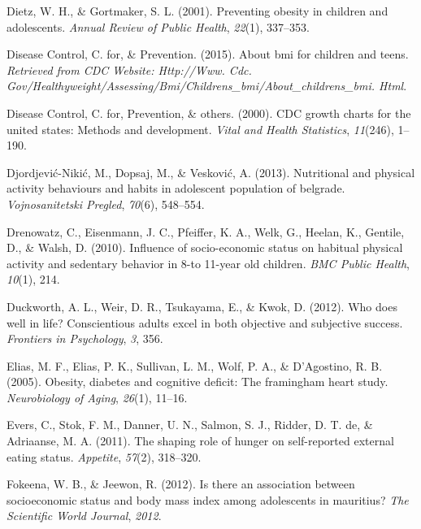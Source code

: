 \documentclass[man]{apa6}
\begin{document}
\leavevmode\hypertarget{ref-dietz2001preventing}{}%
Dietz, W. H., \& Gortmaker, S. L. (2001). Preventing obesity in children and adolescents. \emph{Annual Review of Public Health}, \emph{22}(1), 337--353.

\leavevmode\hypertarget{ref-centers2015bmi}{}%
Disease Control, C. for, \& Prevention. (2015). About bmi for children and teens. \emph{Retrieved from CDC Website: Http://Www. Cdc. Gov/Healthyweight/Assessing/Bmi/Childrens\_bmi/About\_childrens\_bmi. Html}.

\leavevmode\hypertarget{ref-centers2000cdc}{}%
Disease Control, C. for, Prevention, \& others. (2000). CDC growth charts for the united states: Methods and development. \emph{Vital and Health Statistics}, \emph{11}(246), 1--190.

\leavevmode\hypertarget{ref-djordjevic2013nutritional}{}%
Djordjević-Nikić, M., Dopsaj, M., \& Vesković, A. (2013). Nutritional and physical activity behaviours and habits in adolescent population of belgrade. \emph{Vojnosanitetski Pregled}, \emph{70}(6), 548--554.

\leavevmode\hypertarget{ref-drenowatz2010influence}{}%
Drenowatz, C., Eisenmann, J. C., Pfeiffer, K. A., Welk, G., Heelan, K., Gentile, D., \& Walsh, D. (2010). Influence of socio-economic status on habitual physical activity and sedentary behavior in 8-to 11-year old children. \emph{BMC Public Health}, \emph{10}(1), 214.

\leavevmode\hypertarget{ref-duckworth2012does}{}%
Duckworth, A. L., Weir, D. R., Tsukayama, E., \& Kwok, D. (2012). Who does well in life? Conscientious adults excel in both objective and subjective success. \emph{Frontiers in Psychology}, \emph{3}, 356.

\leavevmode\hypertarget{ref-elias2005obesity}{}%
Elias, M. F., Elias, P. K., Sullivan, L. M., Wolf, P. A., \& D'Agostino, R. B. (2005). Obesity, diabetes and cognitive deficit: The framingham heart study. \emph{Neurobiology of Aging}, \emph{26}(1), 11--16.

\leavevmode\hypertarget{ref-evers2011shaping}{}%
Evers, C., Stok, F. M., Danner, U. N., Salmon, S. J., Ridder, D. T. de, \& Adriaanse, M. A. (2011). The shaping role of hunger on self-reported external eating status. \emph{Appetite}, \emph{57}(2), 318--320.

\leavevmode\hypertarget{ref-fokeena2012there}{}%
Fokeena, W. B., \& Jeewon, R. (2012). Is there an association between socioeconomic status and body mass index among adolescents in mauritius? \emph{The Scientific World Journal}, \emph{2012}.
\end{document}
